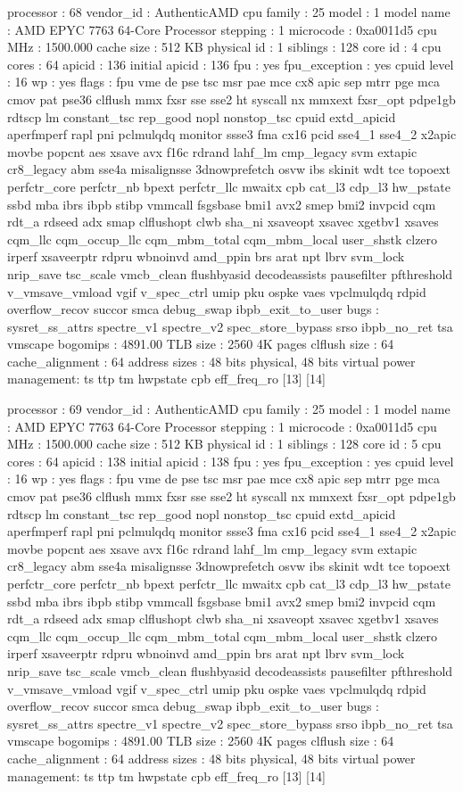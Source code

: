 processor	: 68
vendor_id	: AuthenticAMD
cpu family	: 25
model		: 1
model name	: AMD EPYC 7763 64-Core Processor
stepping	: 1
microcode	: 0xa0011d5
cpu MHz		: 1500.000
cache size	: 512 KB
physical id	: 1
siblings	: 128
core id		: 4
cpu cores	: 64
apicid		: 136
initial apicid	: 136
fpu		: yes
fpu_exception	: yes
cpuid level	: 16
wp		: yes
flags		: fpu vme de pse tsc msr pae mce cx8 apic sep mtrr pge mca cmov pat pse36 clflush mmx fxsr sse sse2 ht syscall nx mmxext fxsr_opt pdpe1gb rdtscp lm constant_tsc rep_good nopl nonstop_tsc cpuid extd_apicid aperfmperf rapl pni pclmulqdq monitor ssse3 fma cx16 pcid sse4_1 sse4_2 x2apic movbe popcnt aes xsave avx f16c rdrand lahf_lm cmp_legacy svm extapic cr8_legacy abm sse4a misalignsse 3dnowprefetch osvw ibs skinit wdt tce topoext perfctr_core perfctr_nb bpext perfctr_llc mwaitx cpb cat_l3 cdp_l3 hw_pstate ssbd mba ibrs ibpb stibp vmmcall fsgsbase bmi1 avx2 smep bmi2 invpcid cqm rdt_a rdseed adx smap clflushopt clwb sha_ni xsaveopt xsavec xgetbv1 xsaves cqm_llc cqm_occup_llc cqm_mbm_total cqm_mbm_local user_shstk clzero irperf xsaveerptr rdpru wbnoinvd amd_ppin brs arat npt lbrv svm_lock nrip_save tsc_scale vmcb_clean flushbyasid decodeassists pausefilter pfthreshold v_vmsave_vmload vgif v_spec_ctrl umip pku ospke vaes vpclmulqdq rdpid overflow_recov succor smca debug_swap ibpb_exit_to_user
bugs		: sysret_ss_attrs spectre_v1 spectre_v2 spec_store_bypass srso ibpb_no_ret tsa vmscape
bogomips	: 4891.00
TLB size	: 2560 4K pages
clflush size	: 64
cache_alignment	: 64
address sizes	: 48 bits physical, 48 bits virtual
power management: ts ttp tm hwpstate cpb eff_freq_ro [13] [14]

processor	: 69
vendor_id	: AuthenticAMD
cpu family	: 25
model		: 1
model name	: AMD EPYC 7763 64-Core Processor
stepping	: 1
microcode	: 0xa0011d5
cpu MHz		: 1500.000
cache size	: 512 KB
physical id	: 1
siblings	: 128
core id		: 5
cpu cores	: 64
apicid		: 138
initial apicid	: 138
fpu		: yes
fpu_exception	: yes
cpuid level	: 16
wp		: yes
flags		: fpu vme de pse tsc msr pae mce cx8 apic sep mtrr pge mca cmov pat pse36 clflush mmx fxsr sse sse2 ht syscall nx mmxext fxsr_opt pdpe1gb rdtscp lm constant_tsc rep_good nopl nonstop_tsc cpuid extd_apicid aperfmperf rapl pni pclmulqdq monitor ssse3 fma cx16 pcid sse4_1 sse4_2 x2apic movbe popcnt aes xsave avx f16c rdrand lahf_lm cmp_legacy svm extapic cr8_legacy abm sse4a misalignsse 3dnowprefetch osvw ibs skinit wdt tce topoext perfctr_core perfctr_nb bpext perfctr_llc mwaitx cpb cat_l3 cdp_l3 hw_pstate ssbd mba ibrs ibpb stibp vmmcall fsgsbase bmi1 avx2 smep bmi2 invpcid cqm rdt_a rdseed adx smap clflushopt clwb sha_ni xsaveopt xsavec xgetbv1 xsaves cqm_llc cqm_occup_llc cqm_mbm_total cqm_mbm_local user_shstk clzero irperf xsaveerptr rdpru wbnoinvd amd_ppin brs arat npt lbrv svm_lock nrip_save tsc_scale vmcb_clean flushbyasid decodeassists pausefilter pfthreshold v_vmsave_vmload vgif v_spec_ctrl umip pku ospke vaes vpclmulqdq rdpid overflow_recov succor smca debug_swap ibpb_exit_to_user
bugs		: sysret_ss_attrs spectre_v1 spectre_v2 spec_store_bypass srso ibpb_no_ret tsa vmscape
bogomips	: 4891.00
TLB size	: 2560 4K pages
clflush size	: 64
cache_alignment	: 64
address sizes	: 48 bits physical, 48 bits virtual
power management: ts ttp tm hwpstate cpb eff_freq_ro [13] [14]

